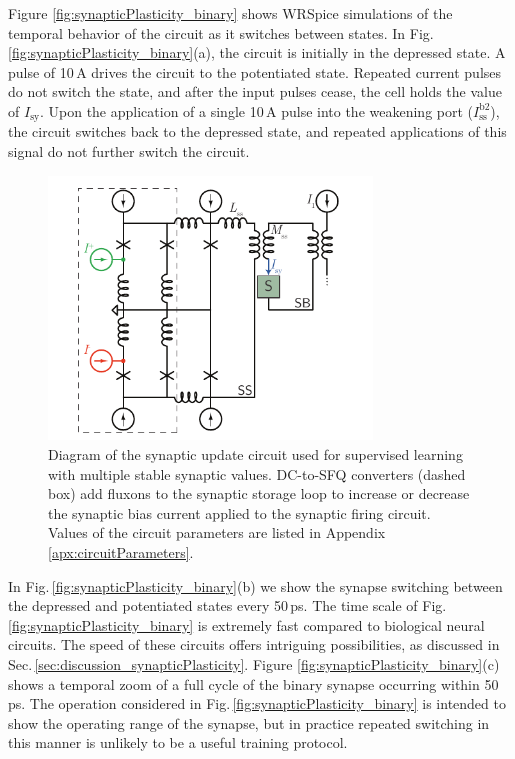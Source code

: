 \documentclass[twocolumn]{article}
\begin{document}
Figure \ref{fig:synapticPlasticity_binary} shows WRSpice simulations of the temporal behavior of the circuit as it switches between states. In Fig.\,\ref{fig:synapticPlasticity_binary}(a), the circuit is initially in the depressed state. A pulse of 10\,\textmu A drives the circuit to the potentiated state. Repeated current pulses do not switch the state, and after the input pulses cease, the cell holds the value of $I_{\mathrm{sy}}$. Upon the application of a single 10\,\textmu A pulse into the weakening port ($I_{\mathrm{ss}}^{\mathrm{b2}}$), the circuit switches back to the depressed state, and repeated applications of this signal do not further switch the circuit.

\begin{figure}[t!]
	\centerline{\includegraphics[width=8.6cm]{_synapticPlasticity_supervisedCircuit_small.pdf}}
	\caption{\label{fig:synapticPlasticity_supervisedCircuit} Diagram of the synaptic update circuit used for supervised learning with multiple stable synaptic values. DC-to-SFQ converters (dashed box) add fluxons to the synaptic storage loop to increase or decrease the synaptic bias current applied to the synaptic firing circuit. Values of the circuit parameters are listed in Appendix \ref{apx:circuitParameters}.}
\end{figure}
In Fig.\,\ref{fig:synapticPlasticity_binary}(b) we show the synapse switching between the depressed and potentiated states every 50\,ps. The time scale of Fig.\,\ref{fig:synapticPlasticity_binary} is extremely fast compared to biological neural circuits. The speed of these circuits offers intriguing possibilities, as discussed in Sec.\,\ref{sec:discussion_synapticPlasticity}. Figure \ref{fig:synapticPlasticity_binary}(c) shows a temporal zoom of a full cycle of the binary synapse occurring within 50\,ps. The operation considered in Fig.\,\ref{fig:synapticPlasticity_binary} is intended to show the operating range of the synapse, but in practice repeated switching in this manner is unlikely to be a useful training protocol.   
\end{document}
